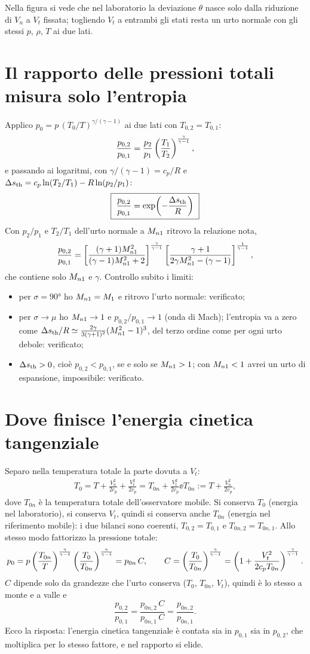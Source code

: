 Nella figura si vede che nel laboratorio la deviazione $\theta$ nasce solo dalla riduzione di $V_n$ a $V_t$ fissata;
togliendo $V_t$ a entrambi gli stati resta un urto normale con gli stessi $p$, $\rho$, $T$ ai due lati.

\section*{Il rapporto delle pressioni totali misura solo l'entropia}
Applico $p_0=p\,(T_0/T)^{\gamma/(\gamma-1)}$ ai due lati con $T_{0,2}=T_{0,1}$:
\[
  \frac{p_{0,2}}{p_{0,1}}=\frac{p_2}{p_1}\left(\frac{T_1}{T_2}\right)^{\frac{\gamma}{\gamma-1}},
\]
e passando ai logaritmi, con $\gamma/(\gamma-1)=c_p/R$ e $\Delta s_{\rm th}=c_p\ln(T_2/T_1)-R\ln(p_2/p_1)$:
\[
  \boxed{\ \frac{p_{0,2}}{p_{0,1}}=\exp\!\left(-\frac{\Delta\sth}{R}\right)\ }
\]
Con $p_2/p_1$ e $T_2/T_1$ dell'urto normale a $M_{n1}$ ritrovo la relazione nota,
\[
  \frac{p_{0,2}}{p_{0,1}}=
  \left[\frac{(\gamma+1)M_{n1}^2}{(\gamma-1)M_{n1}^2+2}\right]^{\frac{\gamma}{\gamma-1}}
  \left[\frac{\gamma+1}{2\gamma M_{n1}^2-(\gamma-1)}\right]^{\frac{1}{\gamma-1}},
\]
che contiene solo $M_{n1}$ e $\gamma$. Controllo subito i limiti:
\begin{itemize}[nosep]
  \item per $\sigma=\ang{90}$ ho $M_{n1}=M_1$ e ritrovo l'urto normale: verificato;
  \item per $\sigma\to\mu$ ho $M_{n1}\to1$ e $p_{0,2}/p_{0,1}\to1$ (onda di Mach); l'entropia va a zero come
    $\Delta s_{\rm th}/R\simeq\frac{2\gamma}{3(\gamma+1)^2}(M_{n1}^2-1)^3$, del terzo ordine come per ogni urto debole:
    verificato;
  \item $\Delta s_{\rm th}>0$, cioè $p_{0,2}<p_{0,1}$, se e solo se $M_{n1}>1$; con $M_{n1}<1$ avrei un urto di espansione,
    impossibile: verificato.
\end{itemize}

\section*{Dove finisce l'energia cinetica tangenziale}
Separo nella temperatura totale la parte dovuta a $V_t$:
\begin{gather*}
  T_0=T+\frac{V_n^2}{2c_p}+\frac{V_t^2}{2c_p}=T_{0n}+\frac{V_t^2}{2c_p} \ee
  T_{0n}:=T+\frac{V_n^2}{2c_p},
\end{gather*}
dove $T_{0n}$ è la temperatura totale dell'osservatore mobile. Si conserva $T_0$ (energia nel laboratorio), si
conserva $V_t$, quindi si conserva anche $T_{0n}$ (energia nel riferimento mobile): i due bilanci sono coerenti,
$T_{0,2}=T_{0,1}$ e $T_{0n,2}=T_{0n,1}$. Allo stesso modo fattorizzo la pressione totale:
\begin{gather*}
  p_0=p\left(\frac{T_{0n}}{T}\right)^{\frac{\gamma}{\gamma-1}}\left(\frac{T_0}{T_{0n}}\right)^{\frac{\gamma}{\gamma-1}}=p_{0n}\,C ,\qquad
  C=\left(\frac{T_0}{T_{0n}}\right)^{\frac{\gamma}{\gamma-1}}=\left(1+\frac{V_t^2}{2c_pT_{0n}}\right)^{\frac{\gamma}{\gamma-1}}.
\end{gather*}
$C$ dipende solo da grandezze che l'urto conserva ($T_0$, $T_{0n}$, $V_t$), quindi è lo stesso a monte e a valle e
\[
  \frac{p_{0,2}}{p_{0,1}}=\frac{p_{0n,2}\,C}{p_{0n,1}\,C}=\frac{p_{0n,2}}{p_{0n,1}} .
\]
Ecco la risposta: l'energia cinetica tangenziale è contata sia in $p_{0,1}$ sia in $p_{0,2}$, che moltiplica per lo
stesso fattore, e nel rapporto si elide.


